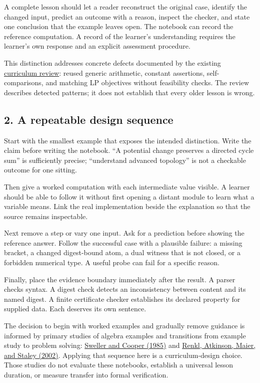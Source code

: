 \documentclass[
  11pt,
]{article}
\begin{document}
A complete lesson should let a reader reconstruct the original case,
identify the changed input, predict an outcome with a reason, inspect
the checker, and state one conclusion that the example leaves open. The
notebook can record the reference computation. A record of the learner's
understanding requires the learner's own response and an explicit
assessment procedure.

This distinction addresses concrete defects documented by the existing
\href{https://github.com/dbccpage/the_symbol_game/blob/52cb5457f6c485ba548cfd292f6012a941ed22cf/education/the_symbol_game/lessons/system_integration/curriculum_125_review.md}{curriculum
review}: reused generic arithmetic, constant assertions,
self-comparisons, and matching LP objectives without feasibility checks.
The review describes detected patterns; it does not establish that every
older lesson is wrong.

\subsection{2. A repeatable design
sequence}\label{a-repeatable-design-sequence}

Start with the smallest example that exposes the intended distinction.
Write the claim before writing the notebook. ``A potential change
preserves a directed cycle sum'' is sufficiently precise; ``understand
advanced topology'' is not a checkable outcome for one sitting.

Then give a worked computation with each intermediate value visible. A
learner should be able to follow it without first opening a distant
module to learn what a variable means. Link the real implementation
beside the explanation so that the source remains inspectable.

Next remove a step or vary one input. Ask for a prediction before
showing the reference answer. Follow the successful case with a
plausible failure: a missing bracket, a changed digest-bound atom, a
dual witness that is not closed, or a forbidden numerical type. A useful
probe can fail for a specific reason.

Finally, place the evidence boundary immediately after the result. A
parser checks syntax. A digest check detects an inconsistency between
content and its named digest. A finite certificate checker establishes
its declared property for supplied data. Each deserves its own sentence.

The decision to begin with worked examples and gradually remove guidance
is informed by primary studies of algebra examples and transitions from
example study to problem solving:
\href{https://www.tandfonline.com/doi/abs/10.1207/s1532690xci0201_3}{Sweller
and Cooper (1985)} and
\href{https://www.tandfonline.com/doi/abs/10.1080/00220970209599510}{Renkl,
Atkinson, Maier, and Staley (2002)}. Applying that sequence here is a
curriculum-design choice. Those studies do not evaluate these notebooks,
establish a universal lesson duration, or measure transfer into formal
verification.
\end{document}
